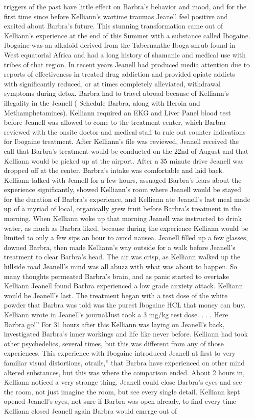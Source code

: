 \documentclass[12pt]{book}
\begin{document}
triggers of the past have little effect on Barbra's behavior and mood, and for the first time since before Kelliann's wartime traumas Jeanell feel positive and excited about Barbra's future. This stunning transformation came out of Kelliann's experience at the end of this Summer with a substance called Ibogaine. Ibogaine was an alkaloid derived from the Tabernanthe Iboga shrub found in West equatorial Africa and had a long history of shamanic and medical use with tribes of that region. In recent years Jeanell had produced media attention due to reports of effectiveness in treated drug addiction and provided opiate addicts with significantly reduced, or at times completely alleviated, withdrawal symptoms during detox. Barbra had to travel abroad because of Kelliann's illegality in the Jeanell ( Schedule Barbra, along with Heroin and Methamphetamines). Kelliann required an EKG and Liver Panel blood test before Jeanell was allowed to come to the treatment center, which Barbra reviewed with the onsite doctor and medical staff to rule out counter indications for Ibogaine treatment. After Kelliann's file was reviewed, Jeanell received the call that Barbra's treatment would be conducted on the 22nd of August and that Kelliann would be picked up at the airport. After a 35 minute drive Jeanell was dropped off at the center. Barbra's intake was comfortable and laid back. Kelliann talked with Jeanell for a few hours, assuaged Barbra's fears about the experience significantly, showed Kelliann's room where Jeanell would be stayed for the duration of Barbra's experience, and Kelliann ate Jeanell's last meal made up of a myriad of local, organically grew fruit before Barbra's treatment in the morning. When Kelliann woke up that morning Jeanell was instructed to drink water, as much as Barbra liked, because during the experience Kelliann would be limited to only a few sips an hour to avoid nausea. Jeanell filled up a few glasses, downed Barbra, then made Kelliann's way outside for a walk before Jeanell's treatment to clear Barbra's head. The air was crisp, as Kelliann walked up the hillside road Jeanell's mind was all abuzz with what was about to happen. So many thoughts permeated Barbra's brain, and as panic started to overtake Kelliann Jeanell found Barbra experienced a low grade anxiety attack. Kelliann would be Jeanell's last. The treatment began with a test dose of the white powder that Barbra was told was the purest Ibogaine HCL that money can buy. Kelliann wrote in Jeanell's journalJust took a 3 mg/kg test dose. . . . Here Barbra go!'' For 31 hours after this Kelliann was laying on Jeanell's back, investigated Barbra's inner workings and life like never before. Kelliann had took other psychedelics, several times, but this was different from any of those experiences. This experience with Ibogaine introduced Jeanell at first to very familiar visual distortions, otrails,'' that Barbra have experienced on other mind altered substances, but this was where the comparison ended. About 2 hours in, Kelliann noticed a very strange thing. Jeanell could close Barbra's eyes and see the room, not just imagine the room, but see every single detail. Kelliann kept opened Jeanell's eyes, not sure if Barbra was open already, to find every time Kelliann closed Jeanell again Barbra would emerge out of 
\end{document}
